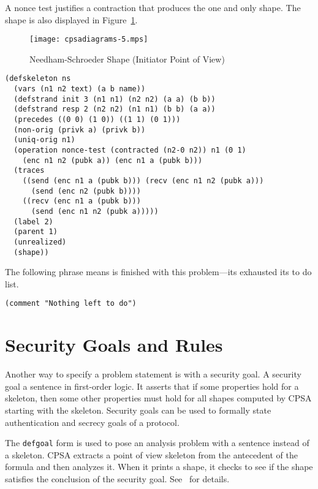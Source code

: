 \documentclass[12pt]{article}
\begin{document}
A nonce test justifies a contraction that produces the one and only
shape.  The shape is also displayed in Figure~\ref{fig:ns init pov}.

\begin{figure}
\begin{center}
\texttt{[image: cpsadiagrams-5.mps]}
\caption{Needham-Schroeder Shape (Initiator Point of View)}
\label{fig:ns init pov}
\end{center}
\end{figure}

\begin{verbatim}
(defskeleton ns
  (vars (n1 n2 text) (a b name))
  (defstrand init 3 (n1 n1) (n2 n2) (a a) (b b))
  (defstrand resp 2 (n2 n2) (n1 n1) (b b) (a a))
  (precedes ((0 0) (1 0)) ((1 1) (0 1)))
  (non-orig (privk a) (privk b))
  (uniq-orig n1)
  (operation nonce-test (contracted (n2-0 n2)) n1 (0 1)
    (enc n1 n2 (pubk a)) (enc n1 a (pubk b)))
  (traces
    ((send (enc n1 a (pubk b))) (recv (enc n1 n2 (pubk a)))
      (send (enc n2 (pubk b))))
    ((recv (enc n1 a (pubk b)))
      (send (enc n1 n2 (pubk a)))))
  (label 2)
  (parent 1)
  (unrealized)
  (shape))
\end{verbatim}

The following phrase means {\cpsa} is finished with this problem---its
exhausted its to do list.

\begin{verbatim}
(comment "Nothing left to do")
\end{verbatim}

\section{Security Goals and Rules}\label{sec:security goals}

Another way to specify a problem statement is with a
security goal. A
security goal a sentence in first-order logic.  It asserts that if
some properties hold for a skeleton, then some other properties must
hold for all shapes computed by CPSA starting with the skeleton.
Security goals can be used to formally state authentication and
secrecy goals of a protocol.

The \texttt{defgoal} form is used to pose an analysis problem with a
sentence instead of a skeleton.  CPSA extracts a point of view
skeleton from the antecedent of the formula and then analyzes it.
When it prints a shape, it checks to see if the shape satisfies the
conclusion of the security goal.  See~\cite{cpsagoals09} for details.
\end{document}
